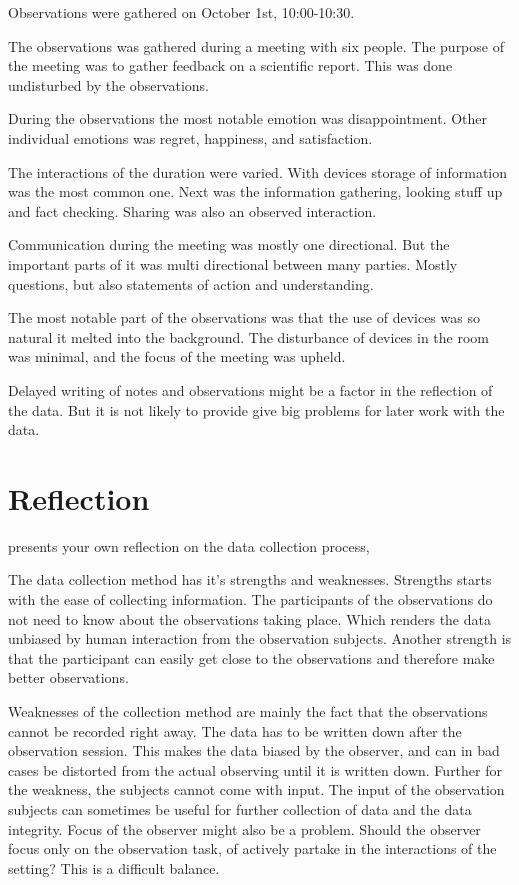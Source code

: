 \documentclass[12pt, a4paper]{article}
\begin{document}
Observations were gathered on October 1st, 10:00-10:30. 

The observations was gathered during a meeting with six people. The purpose of
the meeting was to gather feedback on a scientific report. This was done
undisturbed by the observations.  

During the observations the most notable emotion was disappointment. Other
individual emotions was regret, happiness, and satisfaction.

The interactions of the duration were varied. With devices storage of
information was the most common one. Next was the information gathering,
looking stuff up and fact checking. Sharing was also an observed interaction.

Communication during the meeting was mostly one directional. But the important
parts of it was multi directional between many parties. Mostly questions, but
also statements of action and understanding.

The most notable part of the observations was that the use of devices was so
natural it melted into the background. The disturbance of devices in the room
was minimal, and the focus of the meeting was upheld.

Delayed writing of notes and observations might be a factor in the reflection
of the data. But it is not likely to provide give big problems for later work
with the data. 

\section{Reflection}
presents your own reflection on the data collection process,

The data collection method has it's strengths and weaknesses. Strengths starts
with the ease of collecting information. The participants of the observations
do not need to know about the observations taking place. Which renders the data
unbiased by human interaction from the observation subjects. Another strength
is that the participant can easily get close to the observations and therefore
make better observations.

Weaknesses of the collection method are mainly the fact that the observations
cannot be recorded right away. The data has to be written down after the
observation session. This makes the data biased by the observer, and can in bad
cases be distorted from the actual observing until it is written down. Further
for the weakness, the subjects cannot come with input. The input of the
observation subjects can sometimes be useful for further collection of data and
the data integrity. Focus of the observer might also be a problem. Should the
observer focus only on the observation task, of actively partake in the
interactions of the setting? This is a difficult balance. 
\end{document}

